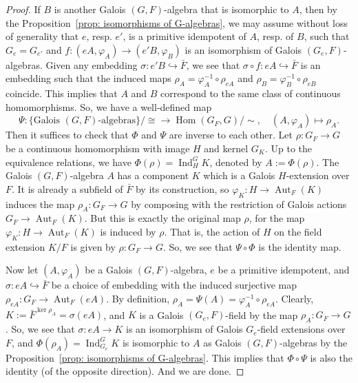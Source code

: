 \documentclass[12pt,a4paper]{amsart}
\numberwithin{equation}{section}%
\theoremstyle{plain}%
\theoremstyle{definition}%
\theoremstyle{remark}%
\begin{document}
\begin{proof}
		If $B$ is another Galois $(G,F)$-algebra that is isomorphic to $A$, then by the Proposition~\ref{prop: isomorphisms of G-algebras}, we may assume without loss of generality that $e$, resp. $e'$, is a primitive idempotent of $A$, resp. of $B$, such that $G_e=G_{e'}$ and $f:(eA,\varphi_{A})\to(e'B,\varphi_{B})$ is an isomorphism of Galois $(G_e,F)$-algebras.
		Given any embedding $\sigma:e'B\hookrightarrow\bar{F}$, we see that $\sigma\circ f:eA\hookrightarrow\bar{F}$ is an embedding such that the induced maps $\rho_A=\varphi_A^{-1}\circ\rho_{eA}$ and $\rho_B=\varphi_B^{-1}\circ\rho_{eB}$ coincide.
		This implies that $A$ and $B$ correspond to the same class of continuous homomorphisms.
		So, we have a well-defined map
		\begin{equation*}
			\Psi:\{\text{Galois }(G,F)\text{-algebras}\}/\cong\to\operatorname{Hom}(G_F,G)/\sim,\quad(A,\varphi_A)\mapsto\rho_A.
		\end{equation*}
		Then it suffices to check that $\Phi$ and $\Psi$ are inverse to each other.
		Let $\rho:G_F\to G$ be a continuous homomorphism with image $H$ and kernel $G_K$.
		Up to the equivalence relations, we have $\Phi(\rho)=\operatorname{Ind}^G_H K$, denoted by $A:=\Phi(\rho)$.
		The Galois $(G,F)$-algebra $A$ has a component $K$ which is a Galois $H$-extension over $F$.
		It is already a subfield of $\bar{F}$ by its construction, so $\varphi_K:H\to\operatorname{Aut}_F(K)$ induces the map $\rho_A:G_F\to G$ by composing with the restriction of Galois actions $G_F\to\operatorname{Aut}_F(K)$.
		But this is exactly the original map $\rho$, for the map $\varphi_K:H\to\operatorname{Aut}_F(K)$ is induced by $\rho$.
		That is, the action of $H$ on the field extension $K/F$ is given by $\rho:G_F\to G$.
		So, we see that $\Psi\circ\Phi$ is the identity map.
		
		Now let $(A,\varphi_A)$ be a Galois $(G,F)$-algebra, $e$ be a primitive idempotent, and $\sigma:eA\hookrightarrow\bar{F}$ be a choice of embedding with the induced surjective map $\rho_{eA}:G_F\to\operatorname{Aut}_F(eA)$.
		By definition, $\rho_A=\Psi(A)=\varphi_A^{-1}\circ\rho_{eA}$.
		Clearly, $K:=\bar{F}^{\ker\rho_A}=\sigma(eA)$, and $K$ is a Galois $(G_e,F)$-field by the map $\rho_A:G_F\to G$.
		So, we see that $\sigma:eA\to K$ is an isomorphism of Galois $G_e$-field extensions over $F$, and $\Phi(\rho_A)=\operatorname{Ind}^G_{G_e}K$ is isomorphic to $A$ as Galois $(G,F)$-algebras by the Proposition~\ref{prop: isomorphisms of G-algebras}.
		This implies that $\Phi\circ\Psi$ is also the identity (of the opposite direction).
		And we are done.
	\end{proof}
\end{document}
